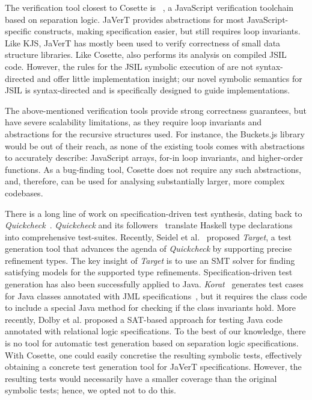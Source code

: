 \documentclass[sigconf, review]{acmart}
\newcommand{\jsil}{JSIL\xspace}
\newcommand{\cosette}{Cosette\xspace}
\newcommand{\myparagraph}[1]{\smallskip\noindent {\bf #1.}\hspace{1pt}}
\begin{document}
The verification tool closest to \cosette is \javert~\cite{javert}, a JavaScript verification toolchain based on separation logic. JaVerT provides abstractions for most JavaScript-specific constructs, making specification easier, but still requires loop invariants. Like KJS, JaVerT has mostly been used to verify correctness of small data structure libraries. Like \cosette, \javert also performs its analysis on compiled \jsil code. However, the rules for the \jsil symbolic execution of \javert are not syntax-directed and offer little implementation insight; our novel symbolic semantics for \jsil is syntax-directed and is specifically designed to guide  implementations.

The above-mentioned verification tools provide strong correctness guarantees, but have severe scalability limitations, as they require loop invariants and abstractions for the recursive structures used. For instance, the Buckets.js library would be out of their reach, as none of the existing tools comes with abstractions to accurately describe: JavaScript arrays, for-in loop invariants, and higher-order functions.  As a bug-finding tool, Cosette does not require any such abstractions, and, therefore, can be used for analysing substantially larger, more complex codebases.



\myparagraph{Specification-driven Testing}
There is a long line of work on specification-driven test synthesis, dating back to 
\emph{Quickcheck}~\cite{claessen:icfp:2000}. \emph{Quickcheck} and its followers~\cite{runciman:haskell:2008,claessen:jfunc:2015}
translate Haskell type declarations into comprehensive test-suites. 
Recently, Seidel et al.~\cite{seidel:esop:2015} proposed \emph{Target}, a test generation tool 
that advances the agenda of \emph{Quickcheck} by supporting precise refinement types. 
The key insight of \emph{Target} is to use %
an SMT solver for finding satisfying models for the supported type refinements. 
Specification-driven test generation has also been successfully applied to Java.
\emph{Korat}~\cite{boyapati:issta:2002,milicevic:icse:2007} generates test cases for Java classes annotated with
JML specifications~\cite{jml}, but it requires the class code to include 
a special Java method for checking if the class invariants hold. 
More recently, Dolby et al. \cite{dolby:fse:2007} proposed a SAT-based approach
for testing Java code annotated with relational logic specifications.
 To the best of our knowledge, there is no tool for automatic test generation 
 based on separation logic specifications.
 With \cosette, one could easily concretise the resulting symbolic tests, effectively 
 obtaining a concrete test generation tool for JaVerT specifications.
 However, the resulting tests would necessarily have a smaller coverage than the 
 original symbolic tests; hence, we opted not to do this. 
\end{document}
